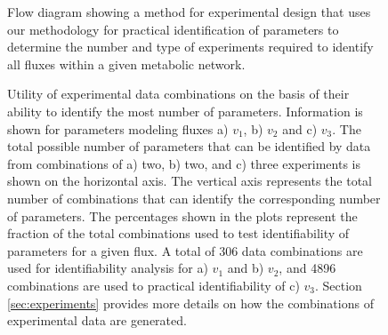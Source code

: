\documentclass[10pt]{article}
\begin{document}
	\begin{figure}[!tbhp]
		\caption{Flow diagram showing a method for experimental design that uses our methodology for practical identification of parameters to determine the number and type of experiments required to identify all fluxes within a given metabolic network.}\label{fig:ident-design}
	\end{figure}

	\begin{figure}[!tbhp]
		\caption{Utility of experimental data combinations on the basis of their ability to identify the most number of parameters. Information is shown for parameters modeling fluxes a) $v_1$, b) $v_2$ and c) $v_3$. The total possible number of parameters that can be identified by data from combinations of a) two, b) two, and c) three experiments is shown on the horizontal axis. The vertical axis represents the total number of combinations that can identify the corresponding number of parameters. The percentages shown in the plots represent the fraction of the total combinations used to test identifiability of parameters for a given flux. A total of 306 data combinations are used for identifiability analysis for a) $v_1$ and b) $v_2$, and 4896 combinations are used to practical identifiability of c) $v_3$. Section \ref{sec:experiments} provides more details on how the combinations of experimental data are generated.}\label{fig:figure4}
	\end{figure}	
\end{document}
